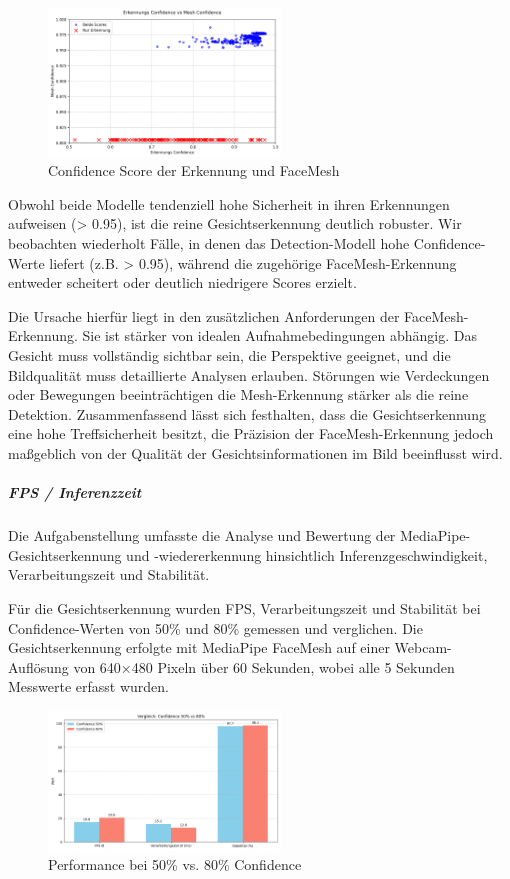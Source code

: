 \begin{figure}[ht]
    \centering
    \includegraphics[width=0.55\textwidth]{data/Detection_vs_Mesh_Confidence.png}
    \caption{Confidence Score der Erkennung und FaceMesh}
    \label{fig:confidence_score_mediapipe}
\end{figure}

Obwohl beide Modelle tendenziell hohe Sicherheit in ihren Erkennungen aufweisen (> 0.95), ist die reine Gesichtserkennung deutlich robuster. Wir beobachten wiederholt Fälle, in denen das Detection-Modell hohe Confidence-Werte liefert (z.B. > 0.95), während die zugehörige FaceMesh-Erkennung entweder scheitert oder deutlich niedrigere Scores erzielt.

Die Ursache hierfür liegt in den zusätzlichen Anforderungen der FaceMesh-Erkennung. Sie ist stärker von idealen Aufnahmebedingungen abhängig. Das Gesicht muss vollständig sichtbar sein, die Perspektive geeignet, und die Bildqualität muss detaillierte Analysen erlauben. 
Störungen wie Verdeckungen oder Bewegungen beeinträchtigen die Mesh-Erkennung stärker als die reine Detektion. Zusammenfassend lässt sich festhalten, dass die Gesichtserkennung eine hohe Treffsicherheit besitzt, die Präzision der FaceMesh-Erkennung jedoch maßgeblich von der Qualität der Gesichtsinformationen im Bild beeinflusst wird.

\subparagraph{FPS / Inferenzzeit} 

Die Aufgabenstellung umfasste die Analyse und Bewertung der MediaPipe-Gesichtserkennung und -wiedererkennung hinsichtlich Inferenzgeschwindigkeit, Verarbeitungszeit und Stabilität.

Für die Gesichtserkennung wurden FPS, Verarbeitungszeit und Stabilität bei Confidence-Werten von 50\% und 80\% gemessen und verglichen. Die Gesichtserkennung erfolgte mit MediaPipe FaceMesh auf einer Webcam-Auflösung von 640×480 Pixeln über 60 Sekunden, wobei alle 5 Sekunden Messwerte erfasst wurden.

\begin{figure}
[ht]
    \centering
    \includegraphics[width=0.55\textwidth]{data/Vergleich_Confidence_50_vs_80.png}
    \caption{Performance bei 50\% vs. 80\% Confidence}
    \label{fig:vergleich_confidence}
\end{figure}

